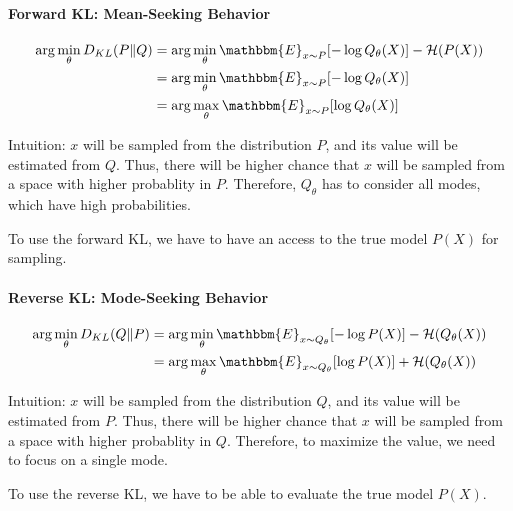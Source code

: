 \paragraph{Forward KL: Mean-Seeking Behavior}
\begin{align*}
\arg\min_{\theta}D_{KL}(P \| Q) &= \arg\min_{\theta} \mathbbm{E}_{x \sim P}[-\log Q_\theta(X)] - \mathcal{H}(P(X))\\
&= \arg\min_{\theta} \mathbbm{E}_{x \sim P}[-\log Q_\theta(X)]\\
&= \arg\max_{\theta} \mathbbm{E}_{x \sim P}[\log Q_\theta(X)]
\end{align*}

Intuition: $x$ will be sampled from the distribution $P$, and its value will be estimated from $Q$. Thus, there will be higher chance that $x$ will be sampled from a space with higher probablity in $P$. Therefore, $Q_\theta$ has to consider all modes, which have high probabilities. 

To use the forward KL, we have to have an access to the true model $P(X)$ for sampling. 

\paragraph{Reverse KL: Mode-Seeking Behavior}
\begin{align*}
\arg\min_{\theta}D_{KL}(Q \| P) &= \arg\min_{\theta} \mathbbm{E}_{x \sim Q_\theta}[-\log P(X)] - \mathcal{H}(Q_\theta(X))\\
&= \arg\max_{\theta} \mathbbm{E}_{x \sim Q_\theta}[\log P(X)] + \mathcal{H}(Q_{\theta}(X))
\end{align*}

Intuition: $x$ will be sampled from the distribution $Q$, and its value will be estimated from $P$. Thus, there will be higher chance that $x$ will be sampled from a space with higher probablity in $Q$. Therefore, to maximize the value, we need to focus on a single mode.  

To use the reverse KL, we have to be able to evaluate the true model $P(X)$. 


